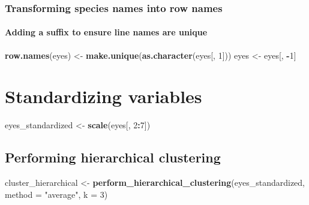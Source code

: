 \documentclass[
]{article}
\newenvironment{Shaded}{\begin{snugshade}}{\end{snugshade}}
\newcommand{\AttributeTok}[1]{\textcolor[rgb]{0.13,0.29,0.53}{#1}}
\newcommand{\DecValTok}[1]{\textcolor[rgb]{0.00,0.00,0.81}{#1}}
\newcommand{\FunctionTok}[1]{\textcolor[rgb]{0.13,0.29,0.53}{\textbf{#1}}}
\newcommand{\NormalTok}[1]{#1}
\newcommand{\OtherTok}[1]{\textcolor[rgb]{0.56,0.35,0.01}{#1}}
\newcommand{\SpecialCharTok}[1]{\textcolor[rgb]{0.81,0.36,0.00}{\textbf{#1}}}
\newcommand{\StringTok}[1]{\textcolor[rgb]{0.31,0.60,0.02}{#1}}
\begin{document}
\subsubsection{Transforming species names into row
names}\label{transforming-species-names-into-row-names}

\paragraph{Adding a suffix to ensure line names are
unique}\label{adding-a-suffix-to-ensure-line-names-are-unique}

\begin{Shaded}
\begin{Highlighting}[]
\FunctionTok{row.names}\NormalTok{(eyes) }\OtherTok{\textless{}{-}} \FunctionTok{make.unique}\NormalTok{(}\FunctionTok{as.character}\NormalTok{(eyes[, }\DecValTok{1}\NormalTok{]))}
\NormalTok{eyes }\OtherTok{\textless{}{-}}\NormalTok{ eyes[, }\SpecialCharTok{{-}}\DecValTok{1}\NormalTok{]}
\end{Highlighting}
\end{Shaded}

\section{Standardizing variables}\label{standardizing-variables}

\begin{Shaded}
\begin{Highlighting}[]
\NormalTok{eyes\_standardized }\OtherTok{\textless{}{-}} \FunctionTok{scale}\NormalTok{(eyes[, }\DecValTok{2}\SpecialCharTok{:}\DecValTok{7}\NormalTok{])}
\end{Highlighting}
\end{Shaded}

\subsection{Performing hierarchical
clustering}\label{performing-hierarchical-clustering}

\begin{Shaded}
\begin{Highlighting}[]
\NormalTok{cluster\_hierarchical }\OtherTok{\textless{}{-}} \FunctionTok{perform\_hierarchical\_clustering}\NormalTok{(eyes\_standardized, }\AttributeTok{method =} \StringTok{"average"}\NormalTok{, }\AttributeTok{k =} \DecValTok{3}\NormalTok{)}
\end{Highlighting}
\end{Shaded}
\end{document}
